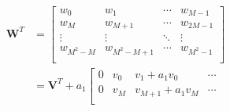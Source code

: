 \begin{equation}
    \label{eq:ZIC_w_trans}
    \begin{aligned}
        \bm{W}^T &= \left[\begin{array}{c|c|c|c}
            w_0 & w_1 & \cdots & w_{M-1} \\ 
            w_M & w_{M+1} & \cdots & w_{2M-1} \\
            \vdots & \vdots & \ddots & \vdots \\
            w_{M^2-M} & w_{M^2-M+1} &\cdots & w_{M^2-1} \\
            \end{array}\right] \\
            &= \bm{V}^T + a_1\left[\begin{array}{c|c|c|c}
                0 & v_0 & v_1+a_1v_0 & \cdots \\ 
                0 & v_M & v_{M+1}+a_1v_M & \cdots \\

\end{array}
\end{aligned}
\end{equation}
